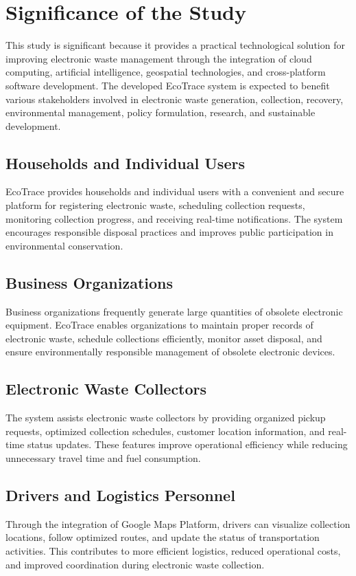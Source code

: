 \section{Significance of the Study}
\label{sec:significance}

This study is significant because it provides a practical technological solution for
improving electronic waste management through the integration of cloud computing,
artificial intelligence, geospatial technologies, and cross-platform software
development. The developed EcoTrace system is expected to benefit various
stakeholders involved in electronic waste generation, collection, recovery,
environmental management, policy formulation, research, and sustainable
development.

\subsection{Households and Individual Users}
EcoTrace provides households and individual users with a convenient and secure
platform for registering electronic waste, scheduling collection requests, monitoring
collection progress, and receiving real-time notifications. The system encourages
responsible disposal practices and improves public participation in environmental
conservation.

\subsection{Business Organizations}
Business organizations frequently generate large quantities of obsolete electronic
equipment. EcoTrace enables organizations to maintain proper records of electronic
waste, schedule collections efficiently, monitor asset disposal, and ensure
environmentally responsible management of obsolete electronic devices.

\subsection{Electronic Waste Collectors}
The system assists electronic waste collectors by providing organized pickup
requests, optimized collection schedules, customer location information, and
real-time status updates. These features improve operational efficiency while
reducing unnecessary travel time and fuel consumption.

\subsection{Drivers and Logistics Personnel}
Through the integration of Google Maps Platform, drivers can visualize collection
locations, follow optimized routes, and update the status of transportation activities.
This contributes to more efficient logistics, reduced operational costs, and improved
coordination during electronic waste collection.

